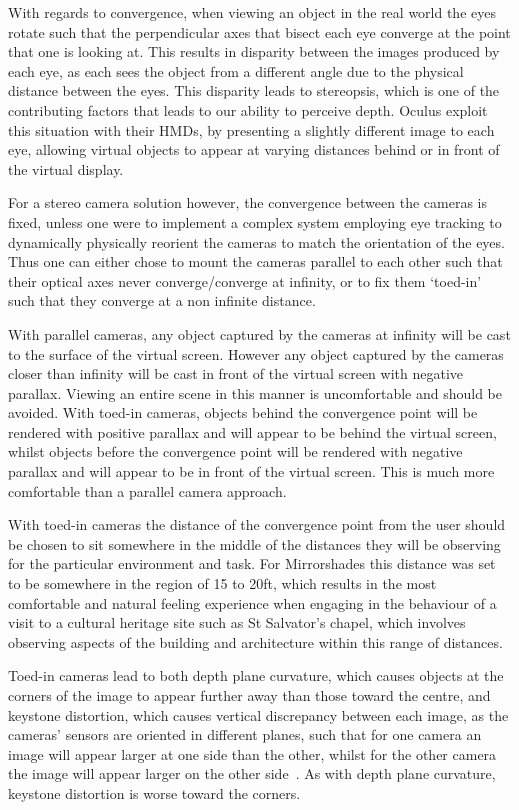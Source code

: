 With regards to convergence, when viewing an object in the real world the eyes rotate such that the perpendicular axes that bisect each eye converge at the point that one is looking at. This results in disparity between the images produced by each eye, as each sees the object from a different angle due to the physical distance between the eyes. This disparity leads to stereopsis, which is one of the contributing factors that leads to our ability to perceive depth. Oculus exploit this situation with their HMDs, by presenting a slightly different image to each eye, allowing virtual objects to appear at varying distances behind or in front of the virtual display.

For a stereo camera solution however, the convergence between the cameras is fixed, unless one were to implement a complex system employing eye tracking to dynamically physically reorient the cameras to match the orientation of the eyes. Thus one can either chose to mount the cameras parallel to each other such that their optical axes never converge/converge at infinity, or to fix them `toed-in' such that they converge at a non infinite distance.

With parallel cameras, any object captured by the cameras at infinity will be cast to the surface of the virtual screen. However any object captured by the cameras closer than infinity will be cast in front of the virtual screen with negative parallax. Viewing an entire scene in this manner is uncomfortable and should be avoided. With toed-in cameras, objects behind the convergence point will be rendered with positive parallax and will appear to be behind the virtual screen, whilst objects before the convergence point will be rendered with negative parallax and will appear to be in front of the virtual screen. This is much more comfortable than a parallel camera approach.

With toed-in cameras the distance of the convergence point from the user should be chosen to sit somewhere in the middle of the distances they will be observing for the particular environment and task. For Mirrorshades this distance was set to be somewhere in the region of 15 to 20ft, which results in the most comfortable and natural feeling experience when engaging in the behaviour of a visit to a cultural heritage site such as St Salvator's chapel, which involves observing aspects of the building and architecture within this range of distances.

Toed-in cameras lead to both depth plane curvature, which causes objects at the corners of the image to appear further away than those toward the centre, and keystone distortion, which causes vertical discrepancy between each image, as the cameras' sensors are oriented in different planes, such that for one camera an image will appear larger at one side than the other, whilst for the other camera the image will appear larger on the other side~\cite{Woods1993}. As with depth plane curvature, keystone distortion is worse toward the corners.

